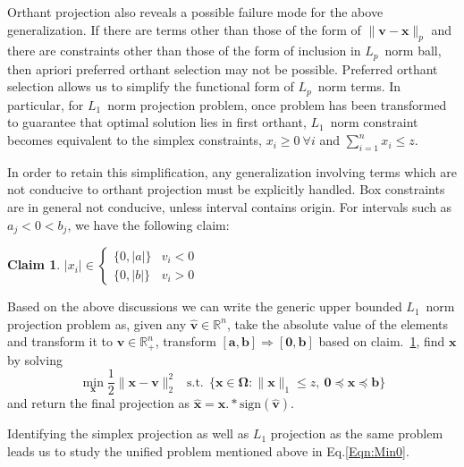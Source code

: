 \documentclass{article}
\newcommand{\mathbs}{\boldsymbol}
\newtheorem{claim}{Claim}
\def\Lo{$L_1$~}
\def\Lp{$L_p$~}
\begin{document}
Orthant projection also reveals a possible failure mode for the above generalization. If there are terms other than those of the form of $ \| \mathbf{v} - \mathbf{x} \|_p$ and there are constraints other than those of the form of inclusion in \Lp norm ball, then apriori preferred orthant selection may not be possible.
Preferred orthant selection allows us to simplify the functional form of \Lp norm terms.
In particular, for \Lo norm projection problem, once problem has been transformed to guarantee that optimal solution lies in first orthant, \Lo norm constraint becomes equivalent to the simplex constraints, $x_i \ge 0 ~\forall i$ and $ \sum_{i=1}^n{x_i} \le z $.

In order to retain this simplification, any generalization involving terms which are not conducive to orthant projection must be explicitly handled. Box constraints are in general not conducive, unless interval contains origin.
For intervals such as $a_j < 0 < b_j$, we have the following claim:
\begin{claim}\label{Claim:a_b_v}
$|x_i| \in \begin{cases}
   \{0,|a|\} & v_i < 0 \\
   \{0,|b|\} & v_i > 0
  \end{cases}$
\end{claim}



Based on the above discussions we can write the generic upper bounded \Lo norm projection problem as, given any $\mathbf{\hat{v}} \in \mathbb{R}^n$, take the absolute value of the elements and transform it to $\mathbf{{v}} \in \mathbb{R}^n_+$, transform $[\mathbf{a,b}]\Rightarrow [\mathbf{0,{b}}]$ based on claim.~\ref{Claim:a_b_v}, find $\mathbf{{x}}$ by solving
\begin{equation}\label{Eqn:Min0}
      \min_{\mathbf{{x}}} \frac{1}{2}\|\mathbf{{x}-{v}}\|_2^2
 ~~\textrm{ s.t.}~~  \{\mathbf{{x}}\in \mathbs{\Omega}: \|\mathbf{{x}}\|_1 \le z, ~\mathbf{0} \preccurlyeq \mathbf{{x}} \preccurlyeq \mathbf{{b}} \}
\end{equation}
and return the final projection as $\mathbf{\hat{x}} = \mathbf{{x}}.*\textrm{sign}(\mathbf{\hat{v}})$.

Identifying the simplex projection as well as $L_1$ projection as the same problem leads us to study the unified problem mentioned above in Eq.\eqref{Eqn:Min0}.
\end{document}
